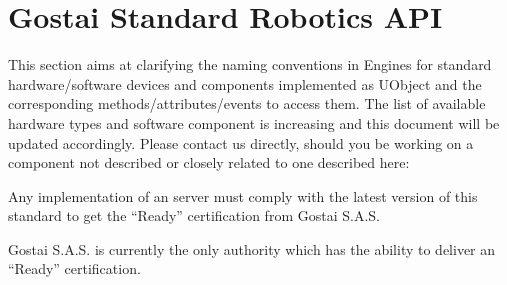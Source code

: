 
\newcommand{\refFacet}[2][\empty]%
  {\refObject[#1]{Interface.#2}}

\newcommand{\interface}[1]{%
  \subsection[#1]{\labelObject{Interface.#1}\lstindex{#1}}%
  \def\currentObject{Interface.#1}%
}

\newcommand{\subinterface}[2]{%
  \subsubsection[#2]{\labelObject{Interface.#2}\lstindex{#2}}%
  \def\currentObject{Interface.#2}%
  Subclass of \refFacet{#1}.%
}

\newcommand{\gsrapi}{Gostai Standard Robotics API\xspace}

\chapter{Gostai Standard Robotics API}
\label{sec:naming}


This section aims at clarifying the naming conventions in \urbi Engines for
standard hardware/software devices and components implemented as UObject and
the corresponding methods/attributes/events to access them. The list of
available hardware types and software component is increasing and this
document will be updated accordingly. Please contact us directly, should you
be working on a component not described or closely related to one described
here:

\begin{center}
\end{center}

Any implementation of an \urbi server must comply with the latest version of
this standard to get the ``\urbi Ready'' certification from Gostai S.A.S.

Gostai S.A.S. is currently the only authority which has the ability to
deliver an ``\urbi Ready'' certification.

